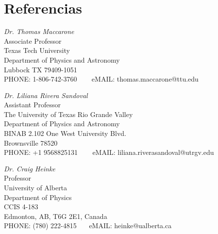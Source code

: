 \documentclass[letterpaper,10pt]{article}
\begin{document}
\pagebreak


\section*{Referencias }  


   \begin{tabbing}
 \emph{Dr. Thomas Maccarone}\\
Associate Professor\\
Texas Tech University \\
Department of Physics and Astronomy \\
Lubbock TX 79409-1051 \\
PHONE:  1-806-742-3760 \,\,\,\,\,\,\,\,\, eMAIL: 
thomas.maccarone@ttu.edu
\end{tabbing}




   \begin{tabbing}
 \emph{Dr. Liliana Rivera Sandoval}\\
Assistant Professor \\
The University of Texas Rio Grande Valley \\
Department of Physics and Astronomy \\
BINAB 2.102 One West University Blvd. \\
Brownsville 78520 \\
PHONE:  +1 9568825131 \,\,\,\,\,\,\,\,\, eMAIL: 
liliana.riverasandoval@utrgv.edu
\end{tabbing}

   \begin{tabbing}
 \emph{Dr. Craig Heinke}\\
Professor \\
University of Alberta \\
Department of Physics \\
 CCIS 4-183 \\
 Edmonton, AB, T6G 2E1, Canada\\
PHONE:  (780) 222-4815\,\,\,\,\,\,\,\,\, eMAIL: 
 heinke@ualberta.ca
\end{tabbing}
\end{document}
